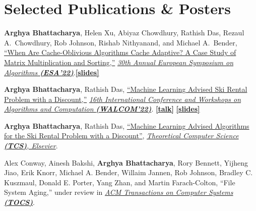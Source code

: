 \documentclass[letterpaper,11pt]{article}
\begin{document}
\section{Selected Publications \& Posters}
\label{sec:pubs}
\resumePublicationListStart

\item \label{paper:esa22} {\textbf{Arghya Bhattacharya}, Helen Xu, Abiyaz Chowdhury, Rathish Das, Rezaul A.\ Chowdhury, Rob Johnson, Rishab Nithyanand, and Michael A.\ Bender, \href{https://drops.dagstuhl.de/opus/volltexte/2022/16954/}{``When Are Cache-Oblivious Algorithms Cache Adaptive? A Case Study of Matrix Multiplication and Sorting,''}  \href{https://algo2022.eu/esa/}{\textit{30th Annual European Symposium on Algorithms \textbf{(ESA'22)}}}.\href{https://tinyurl.com/bhattacharya-esa22-talk}{\textbf{[slides]}}}

\item \label{paper:walcom22} {\textbf{Arghya Bhattacharya}, Rathish Das, \href{https://link.springer.com/chapter/10.1007/978-3-030-96731-4_18}{``Machine Learning Advised Ski Rental Problem with a Discount,''} \href{https://walcom2022.unej.ac.id/instruction-for-author/accepted-papers}{\textit{16th International Conference and Workshops on Algorithms and Computation \textbf{(WALCOM'22)}}}. \href{https://www.youtube.com/watch?v=CmveDP86fPg}{\textbf{[talk]}} \href{https://tinyurl.com/bhattacharya-walcom22-talk}{\textbf{[slides]}}}

\item \label{paper:tcs22} {\textbf{Arghya Bhattacharya}, Rathish Das, \href{https://authors.elsevier.com/a/1fx3815DaIAszc}{``Machine Learning Advised Algorithms for the Ski Rental Problem with a Discount''}, \href{https://www.sciencedirect.com/journal/theoretical-computer-science}{\textit{Theoretical Computer Science \textbf{(TCS)}, Elsevier}}.}


\item \label{paper:tocs22} {Alex Conway, Ainesh Bakshi, \textbf{Arghya Bhattacharya}, Rory Bennett, Yijheng Jiao, Erik Knorr, Michael A. Bender, Willaim Jannen, Rob Johnson, Bradley C. Kuszmaul, Donald E. Porter, Yang Zhan, and Martin Farach-Colton, {``File System Aging,''} under review in \href{https://dl.acm.org/journal/tocs}{\textit{ACM Transactions on Computer Systems \textbf{(TOCS)}}}.}
\end{document}
